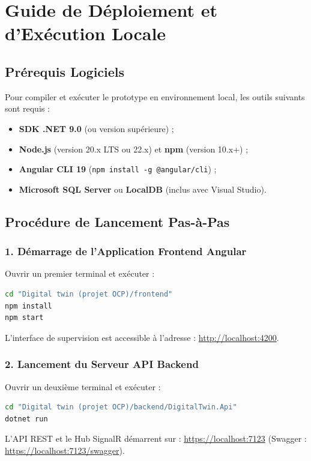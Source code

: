 ﻿\chapter{Guide de Déploiement et d'Exécution Locale}

\section{Prérequis Logiciels}

Pour compiler et exécuter le prototype en environnement local, les outils suivants sont requis :
\begin{itemize}
    \item \textbf{SDK .NET 9.0} (ou version supérieure) ;
    \item \textbf{Node.js} (version 20.x LTS ou 22.x) et \textbf{npm} (version 10.x+) ;
    \item \textbf{Angular CLI 19} (\texttt{npm install -g @angular/cli}) ;
    \item \textbf{Microsoft SQL Server} ou \textbf{LocalDB} (inclus avec Visual Studio).
\end{itemize}

\section{Procédure de Lancement Pas-à-Pas}

\subsection{1. Démarrage de l'Application Frontend Angular}
Ouvrir un premier terminal et exécuter :
\begin{lstlisting}[language=bash]
cd "Digital twin (projet OCP)/frontend"
npm install
npm start
\end{lstlisting}
L'interface de supervision est accessible à l'adresse : \url{http://localhost:4200}.

\subsection{2. Lancement du Serveur API Backend}
Ouvrir un deuxième terminal et exécuter :
\begin{lstlisting}[language=bash]
cd "Digital twin (projet OCP)/backend/DigitalTwin.Api"
dotnet run
\end{lstlisting}
L'API REST et le Hub SignalR démarrent sur : \url{https://localhost:7123} (Swagger : \url{https://localhost:7123/swagger}).

